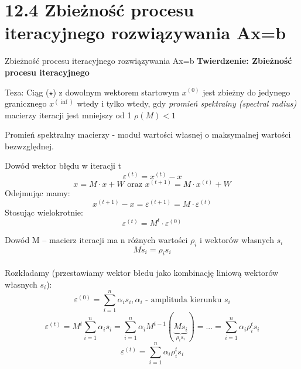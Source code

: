 \section{12.4 Zbieżność procesu iteracyjnego rozwiązywania Ax=b}

\begin{frame}{Zbieżność procesu iteracyjnego rozwiązywania Ax=b}
  \textbf{Twierdzenie: Zbieżność procesu iteracyjnego}
  \begin{block}{Teza:}
    \center Ciąg ($\star$) z dowolnym wektorem startowym $x^{(0)}$ jest zbieżny do jedynego granicznego $x^{(\inf)}$ wtedy i tylko wtedy, gdy \emph{promień spektralny (spectral radius)} macierzy iteracji jest mniejszy od 1
    \center $\rho(M)<1$
  \end{block}
  Promień spektralny macierzy -  moduł wartości własnej o maksymalnej wartości bezwzględnej.
\end{frame}

\begin{frame}{Dowód}
  wektor błędu w iteracji t
    $$\varepsilon^{(t)}=x^{(t)}-x$$ 
    $$
    x=M \cdot x+W \text{ oraz } x^{(t+1)}=M \cdot
    x^{(t)}+W
    $$
    Odejmując mamy:
    $$
    x^{(t+1)}-x=\varepsilon^{(t+1)}= M \cdot \varepsilon^{(t)} 
    $$
    Stosując wielokrotnie:
    $$
    \varepsilon^{(t)}=M^t \cdot \varepsilon^{(0)}
    $$
    
    
  
\end{frame}

\begin{frame}{Dowód}
    M -- macierz iteracji ma n różnych wartości $\rho_i$ i wektorów własnych
    $s_i$
   $$Ms_i=\rho_i s_i$$
    \\Rozkładamy (przestawiamy wektor błedu jako kombinację liniową wektorów własnych $s_i$):
    $$\varepsilon^{(0)}= \sum_{i = 1}^{n} \alpha _i s_i , \alpha _i \text{ - amplituda kierunku } s_i
    $$
    $$
    \varepsilon^{(t)}=M^t \sum_{i = 1}^{n} \alpha _i s_i = \sum_{i = 1}^{n} \alpha _i M^{t-1}(\underbrace{Ms_i}_{\rho _i s_i}) = ... = \sum_{i = 1}^{n} \alpha _i \rho _i^t s_i $$
    $$
    \boxed{\varepsilon^{(t)}=\sum_{i = 1}^{n} \alpha _i \rho _i^t s_i} 
    $$
\end{frame}

